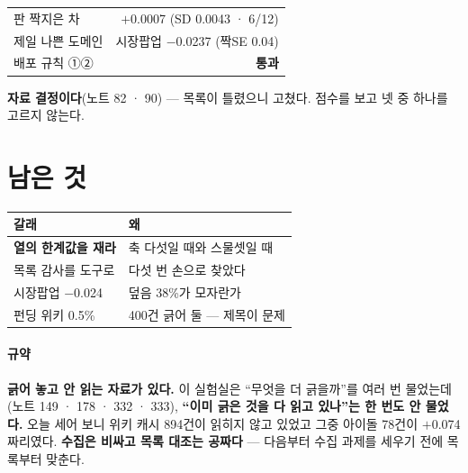 \documentclass[10pt]{article}
\begin{document}
\begin{center}\small
\begin{tabular}{lr}
\hline
판 짝지은 차 & $+$0.0007 (SD 0.0043 · 6/12) \\
제일 나쁜 도메인 & 시장팝업 $-$0.0237 (짝SE 0.04) \\
\hline
배포 규칙 ①② & \textbf{통과} \\
\hline
\end{tabular}
\end{center}

\textbf{자료 결정이다}(노트 82 · 90) --- 목록이 틀렸으니 고쳤다. 점수를
보고 넷 중 하나를 고르지 않는다.

\section{남은 것}
\begin{center}\footnotesize
\begin{tabular}{ll}
\hline
갈래 & 왜 \\
\hline
\textbf{열의 한계값을 재라} & 축 다섯일 때와 스물셋일 때 \\
목록 감사를 도구로 & 다섯 번 손으로 찾았다 \\
시장팝업 $-$0.024 & 덮음 38\%가 모자란가 \\
펀딩 위키 0.5\% & 400건 긁어 둘 --- 제목이 문제 \\
\hline
\end{tabular}
\end{center}

\paragraph{규약} \textbf{긁어 놓고 안 읽는 자료가 있다.} 이 실험실은
``무엇을 더 긁을까''를 여러 번 물었는데(노트 149 · 178 · 332 · 333),
\textbf{``이미 긁은 것을 다 읽고 있나''는 한 번도 안 물었다.} 오늘 세어 보니
위키 캐시 894건이 읽히지 않고 있었고 그중 아이돌 78건이 $+$0.074 짜리였다.
\textbf{수집은 비싸고 목록 대조는 공짜다} --- 다음부터 수집 과제를 세우기
전에 목록부터 맞춘다.
\end{document}
